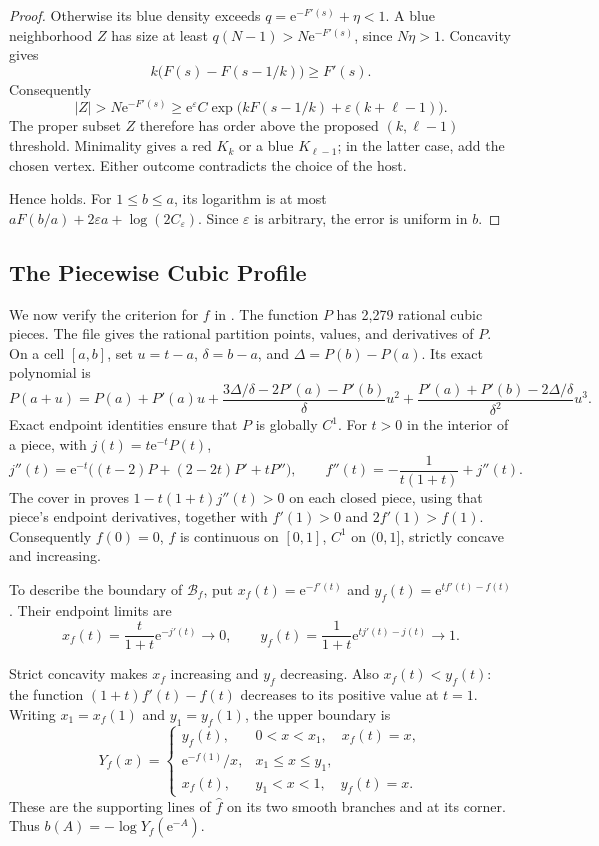 \documentclass[11pt]{article}
\theoremstyle{definition}
\newcommand{\e}{\mathrm e}
\newcommand{\BB}{\mathcal B}
\begin{document}
\begin{proof}
Otherwise its blue density exceeds \(q=\e^{-F'(s)}+\eta<1\). A blue neighborhood \(Z\) has size at least \(q(N-1)>N\e^{-F'(s)}\), since \(N\eta>1\). Concavity gives
\[
 k\bigl(F(s)-F(s-1/k)\bigr)\ge F'(s).
\]
Consequently
\[
 |Z|>N\e^{-F'(s)}
 \ge \e^\varepsilon C\exp\bigl(kF(s-1/k)+\varepsilon(k+\ell-1)\bigr).
\]
The proper subset \(Z\) therefore has order above the proposed \((k,\ell-1)\) threshold. Minimality gives a red \(K_k\) or a blue \(K_{\ell-1}\); in the latter case, add the chosen vertex. Either outcome contradicts the choice of the host.

Hence  holds. For \(1\le b\le a\), its logarithm is at most \(aF(b/a)+2\varepsilon a+\log(2C_\varepsilon)\). Since \(\varepsilon\) is arbitrary, the error is uniform in \(b\).
\end{proof}

\subsection{The Piecewise Cubic Profile}
We now verify the criterion for $f$ in . The function $P$ has 2,279 rational cubic pieces.
The file  gives the rational partition points, values, and derivatives of \(P\). On a cell \([a,b]\), set \(u=t-a\), \(\delta=b-a\), and \(\Delta=P(b)-P(a)\). Its exact polynomial is
\[
 P(a+u)=P(a)+P'(a)u
 +\frac{3\Delta/\delta-2P'(a)-P'(b)}\delta u^2
 +\frac{P'(a)+P'(b)-2\Delta/\delta}{\delta^2}u^3.
\]
Exact endpoint identities ensure that \(P\) is globally \(C^1\). For \(t>0\) in the interior of a piece, with \(j(t)=t\e^{-t}P(t)\),
\[
 j''(t)=\e^{-t}\bigl((t-2)P+(2-2t)P'+tP''\bigr),
 \qquad f''(t)=-\frac1{t(1+t)}+j''(t).
\]
The cover in  proves \(1-t(1+t)j''(t)>0\) on each closed piece, using that piece's endpoint derivatives, together with \(f'(1)>0\) and \(2f'(1)>f(1)\).
Consequently $f(0)=0$, $f$ is continuous on $[0,1]$, $C^1$ on $(0,1]$, strictly concave and increasing.

To describe the boundary of $\BB_f$, put $x_f(t)=\e^{-f'(t)}$ and $y_f(t)=\e^{tf'(t)-f(t)}$.
Their endpoint limits are
\[
 x_f(t)=\frac{t}{1+t}\e^{-j'(t)}\longrightarrow0,\qquad
 y_f(t)=\frac1{1+t}\e^{tj'(t)-j(t)}\longrightarrow1.
\]


Strict concavity makes $x_f$ increasing and $y_f$ decreasing.
Also $x_f(t)<y_f(t)$: the function $(1+t)f'(t)-f(t)$ decreases to its positive value at $t=1$.
Writing $x_1=x_f(1)$ and $y_1=y_f(1)$, the upper boundary is
\begin{equation}\label{eq:Y}
 Y_f(x)=
 \begin{cases}
 y_f(t),&0<x<x_1,\quad x_f(t)=x,\\
 \e^{-f(1)}/x,&x_1\le x\le y_1,\\
 x_f(t),&y_1<x<1,\quad y_f(t)=x.
 \end{cases}
\end{equation}
These are the supporting lines of $\widehat f$ on its two smooth branches and at its corner.
Thus $b(A)=-\log Y_f(\e^{-A})$.
\end{document}
